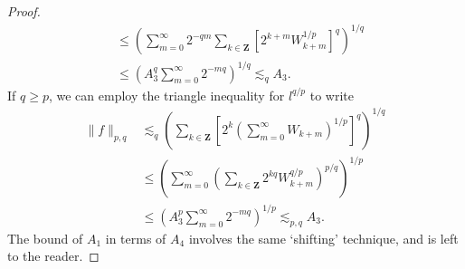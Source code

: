 \begin{proof}
\begin{align*}
        &\leq \left( \sum_{m = 0}^\infty 2^{-qm} \sum_{k \in \mathbf{Z}} \left[ 2^{k+m} W_{k+m}^{1/p} \right]^q \right)^{1/q}\\
        &\leq \left( A_3^q \sum_{m = 0}^\infty 2^{-mq} \right)^{1/q} \lesssim_q A_3.
    \end{align*}
    If $q \geq p$, we can employ the triangle inequality for $l^{q/p}$ to write
    \begin{align*}
        \| f \|_{p,q} &\lesssim_q \left( \sum_{k \in \mathbf{Z}} \left[2^k \left( \sum_{m = 0}^\infty W_{k + m}  \right)^{1/p} \right]^q \right)^{1/q}\\
        &\leq \left( \sum_{m = 0}^\infty \left( \sum_{k \in \mathbf{Z}} 2^{kq} W_{k+m}^{q/p} \right)^{p/q} \right)^{1/p}\\
        &\leq \left( A_3^p \sum_{m = 0}^\infty 2^{-mq} \right)^{1/p} \lesssim_{p,q} A_3.
    \end{align*}
    The bound of $A_1$ in terms of $A_4$ involves the same `shifting' technique, and is left to the reader.
\end{proof}


